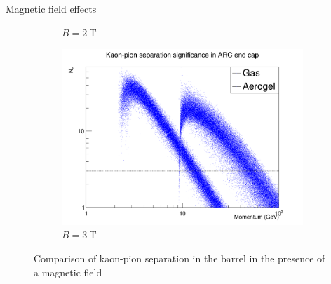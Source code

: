 \documentclass{beamer}
\begin{document}
\begin{frame}{Magnetic field effects}
\begin{figure}
\begin{subfigure}{0.33\textwidth}
      \caption{$B = \SI{2}{\tesla}$}
    \end{subfigure}%
    \begin{subfigure}{0.33\textwidth}
      \includegraphics[width = 1.0\textwidth]{Plots/Significance_Scatter_PionKaon_Barrel_MagOn_3T.png}
      \caption{$B = \SI{3}{\tesla}$}
    \end{subfigure}
    \caption{Comparison of kaon-pion separation in the barrel in the presence of a magnetic field}
  \end{figure}
\end{frame}
\end{document}
